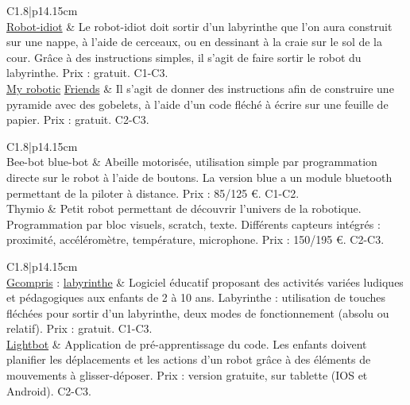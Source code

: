 {
\begin{Ltableau}{\linewidth}{2}{C{1.8}|p{14.15cm}}
   \hline
    \\
   \hline
   \href{https://cutt.ly/kLQNT3a}{\blue Robot-idiot}
   &
   Le \og robot-idiot \fg{} doit sortir d’un labyrinthe que l’on aura construit sur une nappe, à l'aide de cerceaux, ou en dessinant à la craie sur le sol de la cour. Grâce à des instructions simples, il s'agit de faire sortir le robot du labyrinthe. Prix : gratuit. C1-C3. \\
   \hline
   \href{https://code.org/files/CSEDrobotics.pdf}{\blue My robotic} \href{https://code.org/files/CSEDrobotics.pdf}{\blue Friends}
   &
   Il s'agit de donner des instructions afin de construire une pyramide avec des gobelets, à l'aide d'un code fléché à écrire sur une feuille de papier. Prix : gratuit. C2-C3. \\
   \hline
\end{Ltableau}


\begin{Ltableau}{\linewidth}{2}{C{1.8}|p{14.15cm}}
   \hline
    \\
   \hline
   Bee-bot blue-bot
   &
   Abeille motorisée, utilisation simple par programmation directe sur le robot à l'aide de boutons. La version blue a un module bluetooth permettant de la piloter à distance. Prix : 85/125 \euro. C1-C2. \\
   \hline 
   Thymio
   &
   Petit robot permettant de découvrir l’univers de la robotique. Programmation par bloc visuels, scratch, texte. Différents capteurs intégrés : proximité, accéléromètre, température, microphone. Prix : 150/195 \euro. C2-C3. \\
   \hline
\end{Ltableau}


\begin{Ltableau}{\linewidth}{2}{C{1.8}|p{14.15cm}}
   \hline
    \\
   \hline
   \href{https://gcompris.net/index-fr.html}{\blue Gcompris} : \href{https://gcompris.net/index-fr.html}{\blue labyrinthe}
   &
   Logiciel éducatif proposant des activités variées ludiques et pédagogiques aux enfants de 2 à 10 ans. Labyrinthe : utilisation de touches fléchées pour sortir d'un labyrinthe, deux modes de fonctionnement (absolu ou relatif). Prix : gratuit. C1-C3. \\
   \hline
   \href{https://lightbot.com}{\blue Lightbot}
   &
   Application de pré-apprentissage du code. Les enfants doivent planifier les déplacements et les actions d’un robot grâce à des éléments de mouvements à glisser-déposer. Prix : version gratuite, sur tablette (IOS et Android). C2-C3. \\
   \hline
\end{Ltableau}


}
